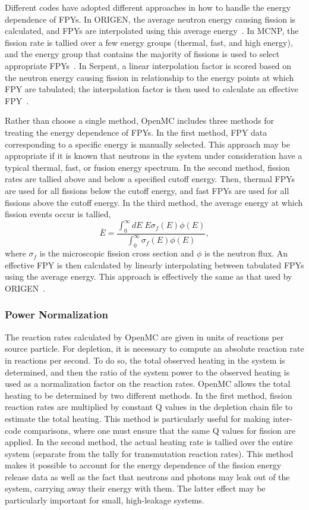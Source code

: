\documentclass[3p,authoryear]{elsarticle}
\begin{document}
Different codes have adopted different approaches in how to handle the energy
dependence of FPYs. In ORIGEN, the average neutron energy causing fission is
calculated, and FPYs are interpolated using this average
energy~\citep{gauld2011nt}. In MCNP, the fission rate is tallied over a few
energy groups (thermal, fast, and high energy), and the energy group that
contains the majority of fissions is used to select appropriate
FPYs~\citep{fensin2008nt,fensin2011lanl}. In Serpent, a linear interpolation
factor is scored based on the neutron energy causing fission in relationship to
the energy points at which FPY are tabulated; the interpolation factor is then
used to calculate an effective FPY~\citep{kunchev2019mc}.

Rather than choose a single method, OpenMC includes three methods for treating
the energy dependence of FPYs. In the first method, FPY data corresponding to a
specific energy is manually selected. This approach may be appropriate if it is
known that neutrons in the system under consideration have a typical thermal,
fast, or fusion energy spectrum. In the second method, fission rates are tallied
above and below a specified cutoff energy. Then, thermal FPYs are used for all
fissions below the cutoff energy, and fast FPYs are used for all fissions above
the cutoff energy. In the third method, the average energy at which fission
events occur is tallied,
\begin{equation}
  \bar{E} = \frac{\int_0^\infty dE \; E \sigma_f(E)\phi(E)}{\int_0^\infty \sigma_f(E) \phi(E)},
\end{equation}
where $\sigma_f$ is the microscopic fission cross section and $\phi$ is the
neutron flux. An effective FPY is then calculated by linearly interpolating
between tabulated FPYs using the average energy. This approach is effectively
the same as that used by ORIGEN~\citep{gauld2011nt}.

\subsubsection{Power Normalization}

The reaction rates calculated by OpenMC are given in units of reactions per
source particle. For depletion, it is necessary to compute an absolute reaction
rate in reactions per second. To do so, the total observed heating in the system
is determined, and then the ratio of the system power to the observed heating is
used as a normalization factor on the reaction rates. OpenMC allows the total
heating to be determined by two different methods. In the first method, fission
reaction rates are multiplied by constant Q values in the depletion chain file
to estimate the total heating. This method is particularly useful for making
inter-code comparisons, where one must ensure that the same Q values for fission
are applied. In the second method, the actual heating rate is tallied over the
entire system (separate from the tally for transmutation reaction rates). This
method makes it possible to account for the energy dependence of the fission
energy release data as well as the fact that neutrons and photons may leak out
of the system, carrying away their energy with them. The latter effect may be
particularly important for small, high-leakage systems.
\end{document}
